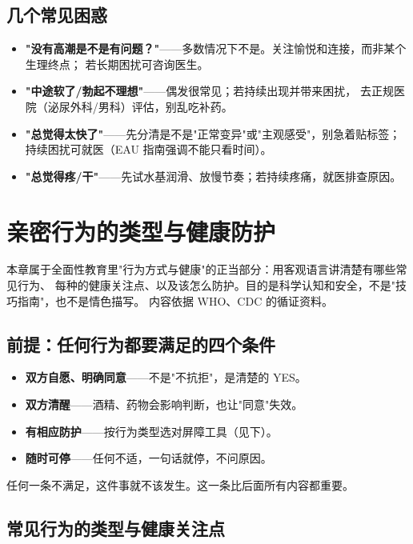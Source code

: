 \section{几个常见困惑}

\begin{itemize}[leftmargin=2em]
  \item \textbf{"没有高潮是不是有问题？"}——多数情况下不是。关注愉悦和连接，而非某个生理终点；
        若长期困扰可咨询医生。
  \item \textbf{"中途软了/勃起不理想"}——偶发很常见；若持续出现并带来困扰，
        去正规医院（泌尿外科/男科）评估，别乱吃补药。
  \item \textbf{"总觉得太快了"}——先分清是不是"正常变异"或"主观感受"，别急着贴标签；
        持续困扰可就医（EAU 指南强调不能只看时间）。
  \item \textbf{"总觉得疼/干"}——先试水基润滑、放慢节奏；若持续疼痛，就医排查原因。
\end{itemize}

\chapter{亲密行为的类型与健康防护}
\label{chap:practices}

本章属于全面性教育里"行为方式与健康"的正当部分：用客观语言讲清楚有哪些常见行为、
每种的健康关注点、以及该怎么防护。目的是科学认知和安全，不是"技巧指南"，也不是情色描写。
内容依据 WHO、CDC 的循证资料。

\section{前提：任何行为都要满足的四个条件}

\begin{itemize}[leftmargin=2em]
  \item \textbf{双方自愿、明确同意}——不是"不抗拒"，是清楚的 YES。
  \item \textbf{双方清醒}——酒精、药物会影响判断，也让"同意"失效。
  \item \textbf{有相应防护}——按行为类型选对屏障工具（见下）。
  \item \textbf{随时可停}——任何不适，一句话就停，不问原因。
\end{itemize}

任何一条不满足，这件事就不该发生。这一条比后面所有内容都重要。

\section{常见行为的类型与健康关注点}

